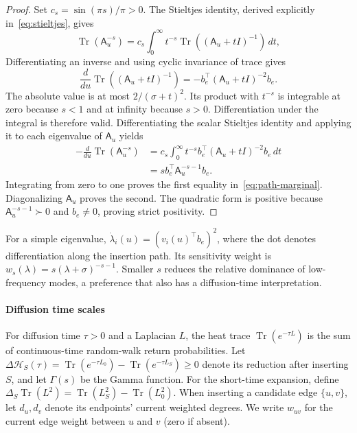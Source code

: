 \documentclass[conference]{IEEEtran}
\theoremstyle{definition}
\DeclareMathOperator{\Tr}{Tr}
\newcommand{\matA}{\mathsf A}
\begin{document}
\begin{proof}
Set $c_s=\sin(\pi s)/\pi>0$. The Stieltjes identity, derived explicitly in~\eqref{eq:stieltjes}, gives
\[
\Tr({\matA}_u^{-s})
=c_s\int_0^\infty t^{-s}\Tr(({\matA}_u+t I)^{-1})\,dt,
\]
Differentiating an inverse and using cyclic invariance of trace gives
\[
\frac{d}{du}\Tr(({\matA}_u+t I)^{-1})
=-b_e^\top({\matA}_u+t I)^{-2}b_e.
\]
The absolute value is at most $2/(\sigma+t)^2$. Its product with $t^{-s}$ is integrable at zero because $s<1$ and at infinity because $s>0$. Differentiation under the integral is therefore valid. Differentiating the scalar Stieltjes identity and applying it to each eigenvalue of ${\matA}_u$ yields
\[
\begin{aligned}
-\frac{d}{du}\Tr({\matA}_u^{-s})
&=c_s\int_0^\infty{ t}^{-s}b_e^\top({\matA}_u+t I)^{-2}b_e\,dt\\
&=s b_e^\top {\matA}_u^{-s-1}b_e.
\end{aligned}
\]
Integrating from zero to one proves the first equality in~\eqref{eq:path-marginal}. Diagonalizing ${\matA}_u$ proves the second. The quadratic form is positive because ${\matA}_u^{-s-1}\succ0$ and $b_e\ne0$, proving strict positivity.
\end{proof}
For a simple eigenvalue, $\dot\lambda_i(u)=(v_i(u)^\top b_e)^2$,
where the dot denotes differentiation along the insertion path.
Its sensitivity weight is $w_s(\lambda)=s(\lambda+\sigma)^{-s-1}$.
Smaller $s$ reduces the relative dominance of low-frequency modes,
a preference that also has a diffusion-time interpretation.

\paragraph*{Diffusion time scales}
For diffusion time $\tau>0$ and a Laplacian $L$,
the heat trace $\Tr(e^{-\tau L})$ is the sum of continuous-time
random-walk return probabilities. Let
$\Delta\mathcal H_S(\tau)=\Tr(e^{-\tau L_0})-\Tr(e^{-\tau L_S})\ge0$
denote its reduction after inserting $S$, and let $\Gamma(s)$
be the Gamma function. For the short-time expansion, define
$\Delta_S\Tr(L^2)=\Tr(L_S^2)-\Tr(L_0^2)$.
When inserting a candidate edge $\{u,v\}$, let $d_u,d_v$
denote its endpoints' current weighted degrees. We write
$w_{uv}$ for the current edge weight between $u$ and $v$
(zero if absent).
\end{document}
